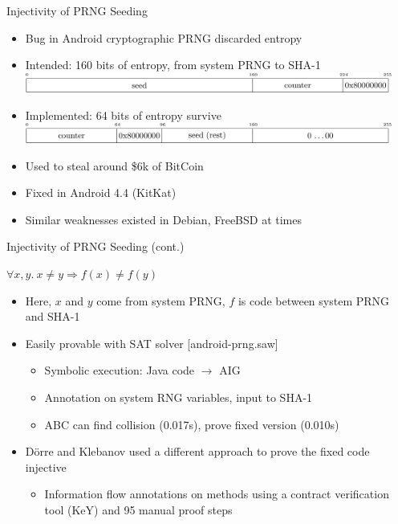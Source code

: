 \documentclass[ignorenonframetext,]{beamer}
\providecommand{\tightlist}{%
  \setlength{\itemsep}{0pt}\setlength{\parskip}{0pt}}
\newcommand{\infile}[1]{{\tiny \alert{[#1]}}}
\begin{document}
\begin{frame}{Injectivity of PRNG Seeding}

\begin{itemize}
\tightlist
\item
  Bug in Android cryptographic PRNG discarded entropy
\item
  Intended: 160 bits of entropy, from system PRNG to SHA-1
  \includegraphics[width=0.95\textwidth]{images/prng-intended.pdf}
\item
  Implemented: 64 bits of entropy survive
  \includegraphics[width=0.95\textwidth]{images/prng-buggy.pdf}
\item
  Used to steal around \$6k of BitCoin
\item
  Fixed in Android 4.4 (KitKat)
\item
  Similar weaknesses existed in Debian, FreeBSD at times
\end{itemize}

\end{frame}

\begin{frame}{Injectivity of PRNG Seeding (cont.)}

\begin{center}
$\forall x, y.~x \neq y \Rightarrow f(x) \neq f(y)$
\end{center}

\begin{itemize}
\tightlist
\item
  Here, \(x\) and \(y\) come from system PRNG, \(f\) is code between
  system PRNG and SHA-1
\item
  Easily provable with SAT solver \infile{android-prng.saw}

  \begin{itemize}
  \tightlist
  \item
    Symbolic execution: Java code \(\rightarrow\) AIG
  \item
    Annotation on system RNG variables, input to SHA-1
  \item
    ABC can find collision (0.017s), prove fixed version (0.010s)
  \end{itemize}
\item Dörre and Klebanov used a different approach to prove the fixed code
  injective \cite{dorre2015prng}

  \begin{itemize}
  \tightlist
  \item
    Information flow annotations on methods using a contract
    verification tool (KeY) and 95 manual proof steps
  \end{itemize}
\end{itemize}

\end{frame}
\end{document}
